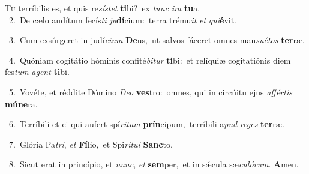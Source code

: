 \lettrine{\initial\textcolor{\initialcolor}{T}}{u} terríbilis es, et quis re\-\textit{sís}\-\textit{tet} \textbf{ti}\-bi?~\star ex \textit{tunc} \textit{i}\-\textit{ra} \textbf{tu}\-a.\\
{\numbfont\textcolor{\numbcolor}{~2.}}~De cælo audítum fecís\textit{ti} \textit{ju}\-\textbf{dí}cium:~\star terra trému\textit{it} \textit{et} \textit{qui}\-\textbf{é}vit.\par
{\numbfont\textcolor{\numbcolor}{~3.}}~Cum exsúrgeret in judí\-\textit{ci}\-\textit{um} \textbf{De}\-us,~\star ut salvos fáceret omnes man\-\textit{su}\-\textit{é}\textit{tos} \textbf{ter}\-ræ.\par
{\numbfont\textcolor{\numbcolor}{~4.}}~Quóniam cogitátio hóminis confité\-\textit{bi}\-\textit{tur} \textbf{ti}\-bi:~\star et relíquiæ cogitatiónis diem fes\textit{tum} \textit{a}\-\textit{gent} \textbf{ti}\-bi.\par
{\numbfont\textcolor{\numbcolor}{~5.}}~Vovéte, et réddite Dómino \textit{De}\-\textit{o} \textbf{ves}\-tro:~\star omnes, qui in circúitu ejus \textit{af}\-\textit{fér}\textit{tis} \textbf{mú}\-\textbf{ne}ra.\par
{\numbfont\textcolor{\numbcolor}{~6.}}~Terríbili et ei qui aufert spí\-\textit{ri}\-\textit{tum} \textbf{prín}\-cipum,~\star terríbili a\textit{pud} \textit{re}\-\textit{ges} \textbf{ter}\-ræ.\par
{\numbfont\textcolor{\numbcolor}{~7.}}~Glória Pa\-\textit{tri}\-, \textit{et} \textbf{Fí}\-lio,~\star et Spi\-\textit{rí}\-\textit{tu}\textit{i} \textbf{Sanc}\-to.\par
{\numbfont\textcolor{\numbcolor}{~8.}}~Sicut erat in princípio, et \textit{nunc}\-, \textit{et} \textbf{sem}\-per,~\star et in sǽcula sæ\-\textit{cu}\-\textit{ló}\textit{rum}. \textbf{A}\-men.\par
